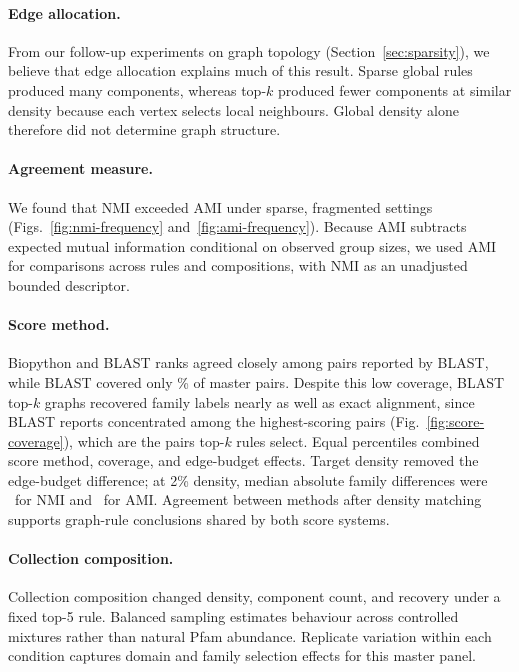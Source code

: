 \documentclass[11pt,a4paper]{article}
\begin{document}
\paragraph{Edge allocation.}
From our follow-up experiments on graph topology (Section~\ref{sec:sparsity}),
we believe that edge allocation explains much of this result. Sparse global
rules produced many components, whereas top-\(k\) produced fewer components at
similar density because each vertex selects local neighbours. Global density
alone therefore did not determine graph structure.

\paragraph{Agreement measure.}
We found that NMI exceeded AMI under sparse, fragmented settings
(Figs.~\ref{fig:nmi-frequency} and~\ref{fig:ami-frequency}). Because AMI
subtracts expected mutual information conditional on observed group sizes, we
used AMI for comparisons across rules and compositions, with NMI as an
unadjusted bounded descriptor.

\paragraph{Score method.}
Biopython and BLAST ranks agreed closely among pairs reported by BLAST, while
BLAST covered only \BlastCoveragePct\% of master pairs. Despite this low
coverage, BLAST top-\(k\) graphs recovered family labels nearly as well as
exact alignment, since BLAST reports concentrated among the highest-scoring
pairs (Fig.~\ref{fig:score-coverage}), which are the pairs top-\(k\) rules
select. Equal percentiles combined
score method, coverage, and edge-budget effects. Target density removed the
edge-budget difference; at 2\% density, median absolute family differences were
\MatchedTwoAbsDeltaNMI\ for NMI and \MatchedTwoAbsDeltaAMI\ for AMI. Agreement
between methods after density matching supports graph-rule conclusions shared
by both score systems.

\paragraph{Collection composition.}
Collection composition changed density, component count, and recovery under a
fixed top-5 rule. Balanced sampling estimates behaviour across controlled
mixtures rather than natural Pfam abundance. Replicate variation within each
condition captures domain and family selection effects for this master panel.
\end{document}
